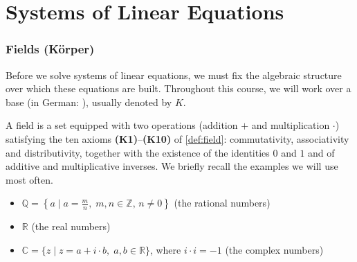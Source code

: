 \renewcommand{\thetheorem}{6.\arabic{theorem}}
\setcounter{theorem}{0}
\setcounter{chapter}{5}
%

\chapter{Systems of Linear Equations}

\subsection{Fields (Körper)}

Before we solve systems of linear equations, we must fix the algebraic structure over which these equations are built. Throughout this course, we will work over a base  (in German: ), usually denoted by $K$.

A field is a set equipped with two operations (addition $+$ and multiplication $\cdot$) satisfying the ten axioms \textbf{(K1)}--\textbf{(K10)} of \cref{def:field}: commutativity, associativity and distributivity, together with the existence of the identities $0$ and $1$ and of additive and multiplicative inverses. We briefly recall the examples we will use most often.

\begin{example}
\begin{itemize}
    \item $\mathbb{Q} = \left\{a \mid a = \frac{m}{n}, \; m, n \in \mathbb{Z}, \, n \ne 0\right\}$ (the rational numbers)
    \item $\mathbb{R}$ (the real numbers)
    \item $\mathbb{C} = \{z \mid z = a + i \cdot b, \; a, b \in \mathbb{R}\}$, where $i \cdot i = -1$ (the complex numbers)
\end{itemize}
\end{example}

